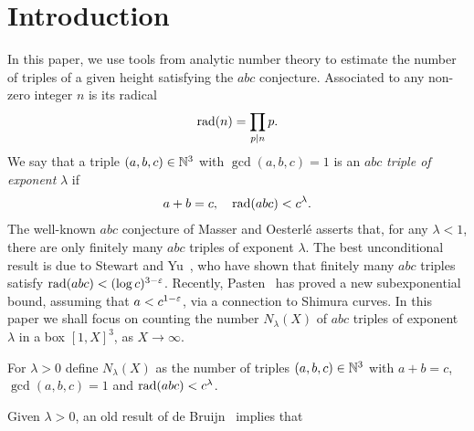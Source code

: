 %

\chapter{Introduction}

In this paper, we use tools from analytic number theory to estimate the number of triples of a given height satisfying the $abc$ conjecture.
Associated to any non-zero integer $n$ is its radical
\begin{align*}
\operatorname{rad}(n)=\prod_{p\mid n}p.
\end{align*}
We say that a triple $(a,b,c)\in \mathbb{N}^3$
with $\gcd(a,b,c)=1$ is an $abc$ \emph{triple of exponent} $\lambda$ if
\begin{align*}
a+b=c,\quad \operatorname{rad}(abc) < c^{\lambda}.
\end{align*}
The well-known $abc$ conjecture of Masser and Oesterl\'e asserts that, for any $\lambda<1$, there are only finitely many $abc$ triples of exponent $\lambda$.
The best unconditional result is due to Stewart and Yu~\cite{styu}, who have shown that finitely many $abc$ triples satisfy $\operatorname{rad}(abc) < (\log c)^{3-\varepsilon}$. Recently, Pasten~\cite{hector} has proved a new subexponential bound, assuming that $a<c^{1-\varepsilon}$, via a connection to Shimura curves.
In this paper we shall focus on counting the number $N_\lambda(X)$ of $abc$ triples of exponent $\lambda$ in a box $[1,X]^3$, as $X\to \infty$.

\begin{definition}\label{def:Nlambda}
For $\lambda>0$ define $N_\lambda(X)$ as the number of triples $(a,b,c)\in \mathbb{N}^3$ with $a+b=c$, $\gcd(a,b,c)=1$ and
$\operatorname{rad}(abc) < c^{\lambda}$.
\end{definition}

Given $\lambda>0$,
an old result of
de Bruijn~\cite{debruijn} implies that

